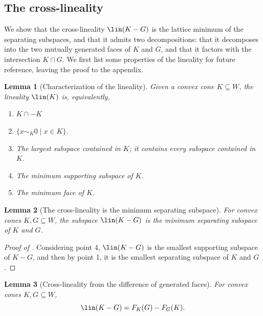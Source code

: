 \documentclass{article}
\theoremstyle{plain}
\newtheorem{lemma}[lemma]{Lemma}
\theoremstyle{definition}
\theoremstyle{remark}
\begin{document}
\subsection{The cross-lineality}
\label{loc:body.lattice_minima.the_cross:lineality}
We show that the cross-lineality $\lin(K-G)$ is the lattice minimum of the separating
subspaces, and that it admits two decompositions: that it decomposes into the two
mutually generated faces of $K$ and $G$, and that it factors with the intersection $K \cap G$.
We first list some properties of the lineality for future reference,
leaving the proof to the appendix.
\begin{lemma}[Characterization of the lineality]
\label{loc:characterization_of_the_lineality.statement}
Given a convex cone $K \subseteq W$, the lineality $\lin(K)$ is, equivalently,
\begin{enumerate}
\item $K \cap -K$
\item $\{x \sim_{K} 0 \mid x \in K\}.$
\item The largest subspace contained in $K$; it contains every subspace contained in $K$. 
\item The minimum supporting subspace of $K$.
\item The minimum face of $K$.
\end{enumerate}
\end{lemma}
\begin{lemma}[The cross-lineality is the minimum separating subspace]
\label{loc:the_cross:lineality_is_the_minimum_separating_subspace.statement}
For convex cones $K, G \subseteq W$, the subspace $\lin(K-G)$ is the minimum separating subspace of $K$ and $G$.
\end{lemma}
\begin{proof}[\hypertarget{loc:the_cross:lineality_is_the_minimum_separating_subspace.proof}{}Proof of ]

Considering  point 4, $\lin(K-G)$ is the smallest
supporting subspace of $K-G$, and then by 
 point 1, it is the smallest separating subspace of $K$ and $G$.
\end{proof}
\begin{lemma}[Cross-lineality from the difference of generated faces]
\label{loc:cross:lineality_from_the_difference_of_generated_faces.statement}
For convex cones $K, G \subseteq W$,
\begin{equation*}
\lin(K-G)= F_K(G)-F_G(K).
\end{equation*}
\end{lemma}
\end{document}

